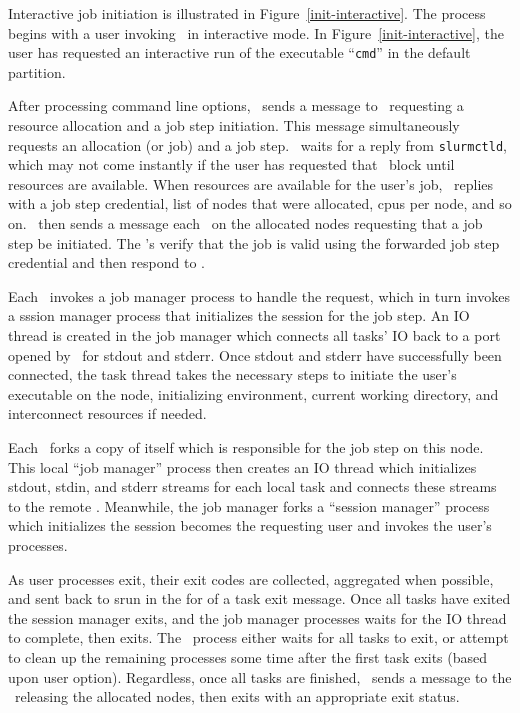 \documentclass[10pt,onecolumn,times]{../common/llncs}
\begin{document}
{Interactive job initiation is illustrated in
Figure~\ref{init-interactive}.  The process begins with a user invoking
\srun\ in interactive mode.  In Figure~\ref{init-interactive}, the user
has requested an interactive run of the executable ``{\tt cmd}'' in the
default partition.

After processing command line options, \srun\ sends a message to
\slurmctld\ requesting a resource allocation and a job step initiation.
This message simultaneously requests an allocation (or job) and a job
step.  \srun\ waits for a reply from {\tt slurmctld}, which may not come
instantly if the user has requested that \srun\ block until resources are
available.  When resources are available for the user's job, \slurmctld\
replies with a job step credential, list of nodes that were allocated,
cpus per node, and so on. \srun\ then sends a message each \slurmd\ on
the allocated nodes requesting that a job step be initiated. The \slurmd
's verify that the job is valid using the forwarded job step credential
and then respond to \srun .

Each \slurmd\ invokes a job manager process to handle the request, which
in turn invokes a sssion manager process that initializes the session for
the job step. An IO thread is created in the job manager which connects
all tasks' IO back to a port opened by \srun\ for stdout and stderr.
Once stdout and stderr have successfully been connected, the task thread
takes the necessary steps to initiate the user's executable on the node,
initializing environment, current working directory, and interconnect
resources if needed.

Each \slurmd\ forks a copy of itself which is responsible for the job
step on this node. This local ``job manager'' process then creates an
IO thread which initializes stdout, stdin, and stderr streams for each
local task and connects these streams to the remote \srun . Meanwhile,
the job manager forks a ``session manager'' process which initializes
the session becomes the requesting user and invokes the user's processes.

As user processes exit, their exit codes are collected, aggregated when
possible, and sent back to srun in the for of a task exit message.
Once all tasks have exited the session manager exits, and the job
manager processes waits for the IO thread to complete, then exits.
The \srun\ process either waits for all tasks to exit, or attempt to
clean up the remaining processes some time after the first task exits
(based upon user option).  Regardless, once all tasks are finished,
\srun\ sends a message to the \slurmctld\ releasing the allocated nodes,
then exits with an appropriate exit status.

}
\end{document}
